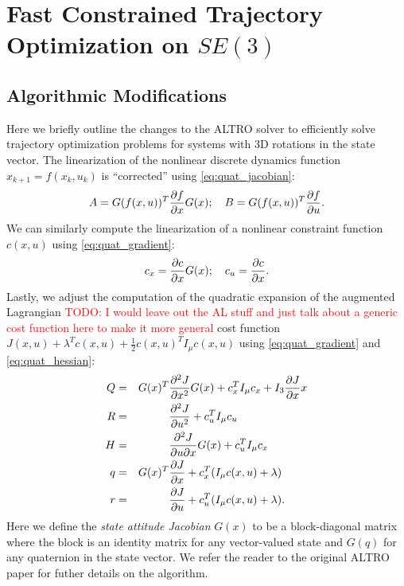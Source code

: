 \documentclass[letterpaper, 10 pt, conference]{ieeeconf}  %
\newcommand{\half}{\frac{1}{2}}
\newcommand{\R}{\mathbb{R}}
\newcommand{\todo}[1]{\textcolor{red}{TODO: #1}}
\begin{document}
\section{Fast Constrained Trajectory Optimization on $SE(3)$}
    \subsection{Algorithmic Modifications}
    Here we briefly outline the changes to the ALTRO solver \cite{howell2019altro} to 
    efficiently solve trajectory optimization problems for systems with 3D rotations in the
    state vector. 
    The linearization of the nonlinear discrete dynamics function $x_{k+1} = f(x_k,u_k)$ is 
    ``corrected'' using \ref{eq:quat_jacobian}:
    \begin{equation}
        A = G(f(x,u))^T \pdv{f}{x} G(x); \quad B = G(f(x,u))^T \pdv{f}{u}.
    \end{equation}
    We can similarly compute the linearization of a nonlinear constraint function $c(x,u)$
    using \ref{eq:quat_gradient}:
    \begin{equation}
        c_x = \pdv{c}{x} G(x); \quad c_u = \pdv{c}{x}.
    \end{equation}
    Lastly, we adjust the computation of the quadratic expansion of the augmented
    Lagrangian \todo{I would leave out the AL stuff and just talk about a generic cost function here to make it more general} cost function $J(x,u) + \lambda^T c(x,u) + \half c(x,u)^T I_\mu c(x,u)$
    using \ref{eq:quat_gradient} and \ref{eq:quat_hessian}:
    \begin{subequations}
        \begin{align}
            Q &= & G(x)^T & \pdv[2]{J}{x} G(x) + c_x^T I_\mu c_x + I_3 \pdv{J}{x} x \\
            R &= &        & \pdv[2]{J}{u}      + c_u^T I_\mu c_u \\
            H &= &        & \pdv{J}{u}{x} G(x) + c_u^T I_\mu c_x \\
            q &= & G(x)^T & \pdv{J}{x} + c_x^T (I_\mu c(x,u) + \lambda) \\
            r &= &        & \pdv{J}{u} + c_u^T (I_\mu c(x,u) + \lambda).
        \end{align}
    \end{subequations}
    Here we define the \textit{state attitude Jacobian} $G(x)$ to be a block-diagonal
    matrix where the block is an identity matrix for any vector-valued state and $G(q)$ for
    any quaternion in the state vector. We refer the reader to the original ALTRO paper 
    \cite{howell2019altro} for futher details on the algorithm.
\end{document}
